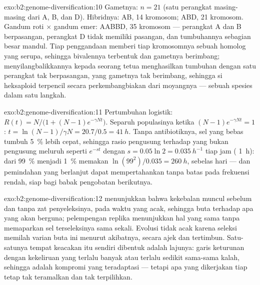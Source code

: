 \begin{solution}{exo:b2:genome-diversification:10}
Gametnya: $n = 21$ (satu perangkat masing-masing dari A, B, dan D).
Hibridnya: AB, 14 kromosom; ABD, 21 kromosom. Gandum roti $\times$
gandum emer: AABBD, 35 kromosom --- perangkat A dan B berpasangan,
perangkat D tidak memiliki pasangan, dan tumbuhannya sebagian besar
mandul. Tiap penggandaan memberi tiap kromosomnya sebuah homolog yang
serupa, sehingga bivalennya terbentuk dan gametnya berimbang;
menyilangbalikkannya kepada seorang tetua menghasilkan tumbuhan dengan
satu perangkat tak berpasangan, yang gametnya tak berimbang, sehingga
si heksaploid terpencil secara perkembangbiakan dari moyangnya ---
sebuah spesies dalam satu langkah.
\end{solution}

\begin{solution}{exo:b2:genome-diversification:11}
Pertumbuhan logistik: $R(t) = N/\bigl(1 + (N - 1)e^{-\gamma Nt}\bigr)$.
Separuh populasinya ketika $(N - 1)e^{-\gamma Nt} = 1$: $t = \ln(N -
1)/\gamma N = 20.7/0.5 = \qty{41}{h}$. Tanpa antibiotiknya, sel yang
bebas  tumbuh \qty{5}{\%} lebih cepat, sehingga rasio pengusung
terhadap yang bukan pengusung meluruh seperti $e^{-st}$ dengan
$s = 0.05\ln 2 =
\qty{0.035}{h^{-1}}$ tiap jam (
\qty{1}{h}): dari \qty{99}{\%} menjadi \qty{1}{\%} memakan
$\ln(99^2)/0.035 = \qty{260}{h}$, sebelas hari --- dan pemindahan yang
berlanjut dapat mempertahankan  tanpa batas pada frekuensi
rendah, siap bagi babak pengobatan berikutnya.
\end{solution}

\begin{solution}{exo:b2:genome-diversification:12}
 menunjukkan bahwa  kekebalan muncul sebelum dan
tanpa zat penyeleksinya, pada waktu yang acak, sehingga  buta
terhadap apa yang akan berguna; pelempengan replika menunjukkan hal
yang sama tanpa memaparkan sel terseleksinya sama sekali. Evolusi tidak
acak karena seleksi memilah varian buta ini menurut akibatnya, secara
ajek dan tertimbun. Satu-satunya tempat keacakan itu sendiri dibentuk
adalah lajunya: garis keturunan dengan kekeliruan yang terlalu banyak
atau terlalu sedikit sama-sama kalah, sehingga  adalah
kompromi yang teradaptasi --- tetapi apa yang dikerjakan tiap 
tetap tak teramalkan dan tak terpilihkan.
\end{solution}

